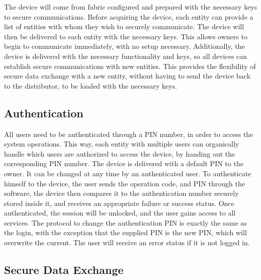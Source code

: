 The device will come from fabric configured and prepared with the necessary keys to secure communications.
Before acquiring the device, each entity can provide a list of entities with whom they wish to securely communicate. The device will then be delivered to each entity with the necessary keys. This allows owners to begin to communicate immediately, with no setup necessary.
Additionally, the device is delivered with the necessary functionality and keys, so all devices can establish secure communications with new entities. This provides the flexibility of secure data exchange with a new entity, without having to send the device back to the distributor, to be loaded with the necessary keys.

\subsection{Authentication}\label{chap:arch:services:auth}

All users need to be authenticated through a PIN number, in order to access the system operations. This way, each entity with multiple users can organically handle which users are authorized to access the device, by handing out the corresponding PIN number.
The device is delivered with a default PIN to the owner. It can be changed at any time by an authenticated user.
To authenticate himself to the device, the user sends the operation code, and PIN through the software, the device then compares it to the authentication number securely stored inside it, and receives an appropriate failure or success status. Once authenticated, the session will be unlocked, and the user gains access to all services.
The protocol to change the authentication PIN is exactly the same as the login, with the exception that the supplied PIN is the new PIN, which will overwrite the current. The user will receive an error status if it is not logged in.


\subsection{Secure Data Exchange}\label{chap:arch:services:data-exchange}

